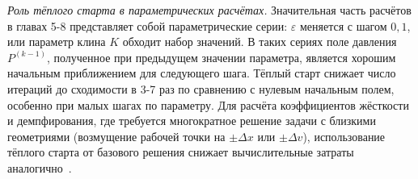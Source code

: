 \textit{Роль тёплого старта в параметрических расчётах.}
Значительная часть расчётов в главах 5-8 представляет собой
параметрические серии: $\varepsilon$ меняется с шагом $0{,}1$,
или параметр клина $K$ обходит набор значений. В таких сериях
поле давления $P^{(k-1)}$, полученное при предыдущем значении
параметра, является хорошим начальным приближением для
следующего шага. Тёплый старт снижает число итераций до
сходимости в 3-7 раз по сравнению с нулевым начальным полем,
особенно при малых шагах по параметру. Для расчёта
коэффициентов жёсткости и демпфирования, где
требуется многократное решение задачи с близкими геометриями
(возмущение рабочей точки на $\pm\Delta x$ или $\pm\Delta v$),
использование тёплого старта от базового решения снижает
вычислительные затраты аналогично~\cite{sfyris2012,chasalevris2013}.
